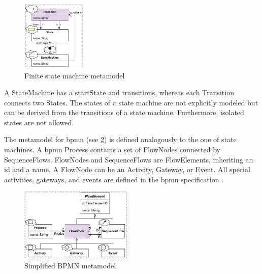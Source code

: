\documentclass{jot}
\begin{document}
\begin{figure}[h]
    \centering
    \includegraphics[width=0.275\textwidth]{figures/state_machine_metamodel.pdf}
    \caption{Finite state machine metamodel}
    \label{fig:fsm_metamodel}
\end{figure}

A \textsf{StateMachine} has a \textsf{startState} and \textsf{transitions}, whereas each \textsf{Transition} connects two \textsf{State}s.
The states of a state machine are not explicitly modeled but can be derived from the transitions of a state machine.
Furthermore, isolated states are not allowed.

The metamodel for \gls*{bpmn} (see \cref{fig:bpmn_metamodel}) is defined analogously to the one of state machines. 
A \gls*{bpmn} \textsf{Process} contains a set of \textsf{FlowNode}s connected by \textsf{SequenceFlow}s.
\textsf{FlowNode}s and \textsf{SequenceFlow}s are \textsf{FlowElement}s, inheriting an \textsf{id} and a \textsf{name}.
A \textsf{FlowNode} can be an \textsf{Activity}, \textsf{Gateway}, or \textsf{Event}.
All special activities, gateways, and events are defined in the \gls*{bpmn} specification \cite{objectmanagementgroupBusinessProcessModel2013}. %

\begin{figure}[h]
    \centering
    \includegraphics[width=0.475\textwidth]{figures/bpmn_metamodel.pdf}
    \caption{Simplified BPMN metamodel \cite{objectmanagementgroupBusinessProcessModel2013}}
    \label{fig:bpmn_metamodel}
\end{figure}
\end{document}

